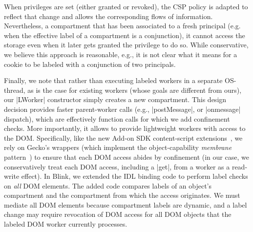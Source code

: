 When privileges are set (either granted or revoked), the CSP policy is adapted
to reflect that change and allows the corresponding flows of
information. Nevertheless, a compartment that has been associated to a fresh
principal (e.g. when the effective label of a compartment is a conjunction), it
cannot access the storage even when it later gets granted the privilege to do
so. While conservative, we believe this approach is reasonable, e.g.,
it is not clear what it means for a cookie to be labeled with a
conjunction of two principals.

%

Finally, we note that rather than executing labeled workers in a
separate OS-thread, as is the case for existing workers (whose goals
are different from ours), our \js|LWorker| constructor simply creates a new
compartment. This design decision provides 
%
faster parent-worker calls (e.g.,
\js|postMessage|, or \js|onmessage| dispatch), which are effectively function
calls for which we add confinement checks. 
%
More importantly, it allows \sys{} to provide lightweight workers with access to the
DOM.
%
Specifically, like the new Add-on SDK content-script
extensions~\cite{addon-sdk}, we rely on Gecko's wrappers (which implement the
object-capability \emph{membrane}
pattern~\cite{miller2003paradigm,miller2006robust}) to ensure that each DOM
access abides by confinement (in our case, we conservatively treat each DOM
access, including a \js|get|, from a worker as a read-write effect).
%
In Blink, we extended the IDL binding code to perform label
checks on \emph{all} DOM elements.
%
The added code compares labels of an object's compartment and the compartment
from which the access originates.
%
We must mediate all DOM elements because compartment labels are dynamic, and a
label change may require revocation of DOM access for all DOM objects that the
labeled DOM worker currently processes.



